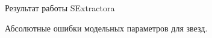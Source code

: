 \documentclass[12pt,a4paper]{article}
\begin{document}
\begin{figure}
\begin{minipage}{0.25\linewidth}
    \end{minipage}
    \hfill 
    \begin{minipage}{0.25\linewidth}
    \end{minipage}
    \caption{ Результат работы SExtractora} \label{pic7}
\end{figure}


\begin{figure}
    \caption{Абсолютные ошибки модельных параметров для звезд.} \label{pic8}
\end{figure}
\end{document}
